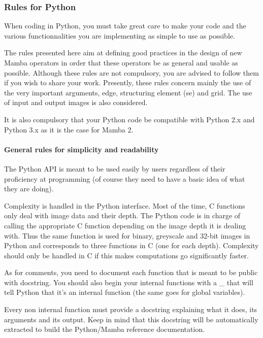 \documentclass[a4paper,10pt,oneside]{article}
\begin{document}
\subsubsection{Rules for Python}
\label{cha:rules}

When coding in Python, you must take great care to make your code and the
various functionnalities you are implementing as simple to use as possible.

The rules presented here aim at defining good practices in the design of new 
Mamba operators in order that these operators be as general and usable as 
possible. Although these rules are not compulsory, you are advised to follow 
them if you wish to share your work. Presently, these rules concern mainly the
use of the very important arguments, edge, structuring element (se) and grid.
The use of input and output images is also considered.

It is also compulsory that your Python code be compatible with Python 2.x and
Python 3.x as it is the case for Mamba 2.

\paragraph{General rules for simplicity and readability}

The Python API is meant to be used easily by users regardless of their
proficiency at programming (of course they need to have a basic idea of what
they are doing).

Complexity is handled in the Python interface. Most of the time, C functions
only deal with image data and their depth. The Python code is in charge of 
calling the appropriate C function depending on the image depth it is 
dealing with. Thus the same function is used for binary, greyscale and 32-bit
images in Python and corresponds to three functions in C (one for
each depth). Complexity should only be handled in C if this makes
computations go significantly faster.

As for comments, you need to document each function that is meant
to be public with docstring. You should also begin your internal functions
with a \textquotedbl{}\_\textquotedbl{} that will tell Python that
it's an internal function (the same goes for global variables).

Every non internal function must provide a docstring explaining what it does,
its arguments and its output. Keep in mind that this docstring will be
automatically extracted to build the Python/Mamba reference documentation.
\end{document}
